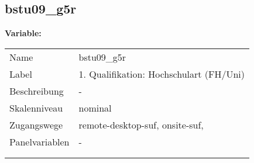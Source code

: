 	
	
	\subsection{bstu09\_g5r}
	\label{subSection:bstu09_g5r}

	\noindent\textbf{Variable:}\\
		\begin{tabular}{lL{11.3cm}}
			\label{tableVariable:bstu09_g5r}
			Name & bstu09\_g5r \\
			Label & 1. Qualifikation: Hochschulart (FH/Uni) \\
			Beschreibung & - \\
			Skalenniveau & nominal \\
			Zugangswege &
				remote-desktop-suf,
				onsite-suf,
 \\
			Panelvariablen & -
			 \\
			 \\
 \\
		\end{tabular}






